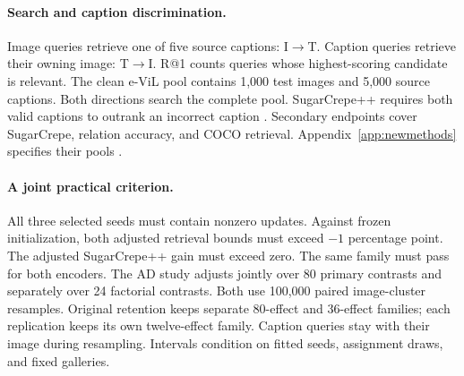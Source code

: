 \paragraph{Search and caption discrimination.}
Image queries retrieve one of five source captions: I$\to$T.
Caption queries retrieve their owning image: T$\to$I.
R@1 counts queries whose highest-scoring candidate is relevant.
The clean e-ViL pool contains 1,000 test images and 5,000 source captions.
Both directions search the complete pool.
SugarCrepe++ requires both valid captions to outrank an incorrect caption \citep{dumpala2024sugarcrepepp}.
Secondary endpoints cover SugarCrepe, relation accuracy, and COCO retrieval.
Appendix~\ref{app:newmethods} specifies their pools \citep{hsieh2023sugarcrepe}.

\paragraph{A joint practical criterion.}
All three selected seeds must contain nonzero updates.
Against frozen initialization, both adjusted retrieval bounds must exceed $-1$ percentage point.
The adjusted SugarCrepe++ gain must exceed zero.
The same family must pass for both encoders.
The AD study adjusts jointly over 80 primary contrasts and separately over 24 factorial contrasts.
Both use 100,000 paired image-cluster resamples.
Original retention keeps separate 80-effect and 36-effect families; each replication keeps its own twelve-effect family.
Caption queries stay with their image during resampling.
Intervals condition on fitted seeds, assignment draws, and fixed galleries.
